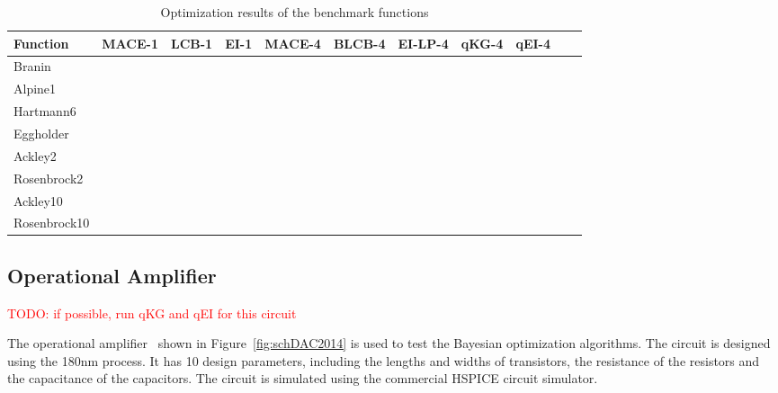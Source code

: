 \begin{table}[tp]
    \centering
    \caption{Optimization results of the benchmark functions}
    \label{tab:result_analytical}
    \begin{tabular}{lllllllllll}
        \toprule
        Function           & MACE-1 & LCB-1  & EI-1  & MACE-4  & BLCB-4  & EI-LP-4 & qKG-4 & qEI-4  \\ \midrule
         Branin            &        &        &       &         &         &         &       &        \\
         Alpine1           &        &        &       &         &         &         &       &        \\
         Hartmann6         &        &        &       &         &         &         &       &        \\
         Eggholder         &        &        &       &         &         &         &       &        \\
         Ackley2           &        &        &       &         &         &         &       &        \\
         Rosenbrock2       &        &        &       &         &         &         &       &        \\
         Ackley10          &        &        &       &         &         &         &       &        \\
         Rosenbrock10      &        &        &       &         &         &         &       &        \\
        \bottomrule
    \end{tabular}
\end{table}

\subsection{Operational Amplifier}


\textcolor{red}{TODO: if possible, run qKG and qEI for this circuit}

The operational amplifier~\cite{wang2014enabling} shown in
Figure~\ref{fig:schDAC2014} is used to test the Bayesian optimization algorithms. The circuit is designed
using the 180nm process. It has 10 design parameters, including the lengths
and widths of transistors, the resistance of the resistors and the capacitance of the
capacitors. The circuit is simulated using the commercial HSPICE circuit simulator.


